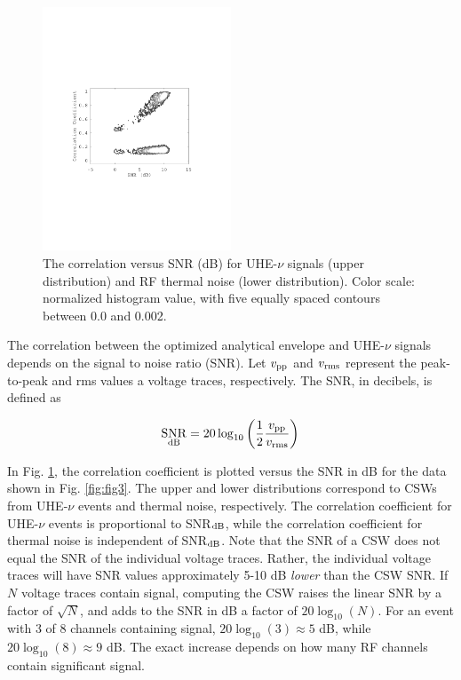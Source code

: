 \documentclass[amsmath,amssymb,aps,prd,10pt,twocolumn,showkeys]{revtex4}
\DeclareMathOperator{\snr}{SNR}
\begin{document}
\begin{itemize}
\begin{figure}
\centering
\includegraphics[width=0.5\textwidth,trim=3.25cm 8.25cm 4.5cm 9.0cm,clip=true]{Aug15_plot2.pdf}
\caption{\label{fig:fig4} The correlation versus SNR (dB) for UHE-$\nu$ signals (upper distribution) and RF thermal noise (lower distribution).  Color scale: normalized histogram value, with five equally spaced contours between 0.0 and 0.002.}
\end{figure}

The correlation between the optimized analytical envelope and UHE-$\nu$ signals depends on the signal to noise ratio (SNR).  Let $v_{\rm pp}$ and $v_{\rm rms}$ represent the peak-to-peak and rms values a voltage traces, respectively.  The SNR, in decibels, is defined as

\begin{equation}
\snr_{\rm dB} = 20\log_{10}\left(\frac{1}{2}\frac{v_{\rm pp}}{v_{\rm rms}}\right)
\end{equation}

In Fig. \ref{fig:fig4}, the correlation coefficient is plotted versus the SNR in dB for the data shown in Fig. \ref{fig:fig3}.  The upper and lower distributions correspond to CSWs from UHE-$\nu$ events and thermal noise, respectively.  The correlation coefficient for UHE-$\nu$ events is proportional to SNR$_{\rm dB}$, while the correlation coefficient for thermal noise is independent of SNR$_{\rm dB}$.  Note that the SNR of a CSW does not equal the SNR of the individual voltage traces.  Rather, the individual voltage traces will have SNR values approximately 5-10 dB \textit{lower} than the CSW SNR.  If $N$ voltage traces contain signal, computing the CSW raises the linear SNR by a factor of $\sqrt{N}$, and adds to the SNR in dB a factor of $20\log_{10}(N)$.  For an event with 3 of 8 channels containing signal, $20\log_{10}(3)\approx 5$ dB, while $20\log_{10}(8)\approx 9$ dB.  The exact increase depends on how many RF channels contain significant signal.


\end{itemize}
\end{document}
